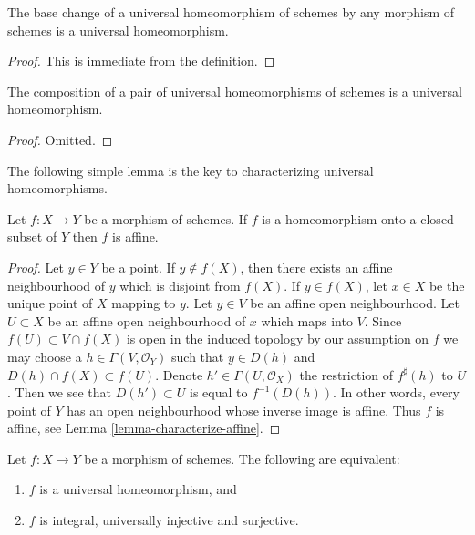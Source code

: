 \begin{lemma}
\label{lemma-base-change-universal-homeomorphism}
The base change of a universal homeomorphism of schemes
by any morphism of schemes is a universal homeomorphism.
\end{lemma}

\begin{proof}
This is immediate from the definition.
\end{proof}

\begin{lemma}
\label{lemma-composition-universal-homeomorphism}
The composition of a pair of universal homeomorphisms of
schemes is a universal homeomorphism.
\end{lemma}

\begin{proof}
Omitted.
\end{proof}

\noindent
The following simple lemma is the key to characterizing universal
homeomorphisms.

\begin{lemma}
\label{lemma-homeomorphism-affine}
Let $f : X \to Y$ be a morphism of schemes. If $f$ is a homeomorphism
onto a closed subset of $Y$ then $f$ is affine.
\end{lemma}

\begin{proof}
Let $y \in Y$ be a point. If $y \not \in f(X)$, then there exists
an affine neighbourhood of $y$ which is disjoint from $f(X)$.
If $y \in f(X)$, let $x \in X$ be the unique point of $X$ mapping to $y$.
Let $y \in V$ be an affine open neighbourhood.
Let $U \subset X$ be an affine open neighbourhood of $x$ which maps into $V$.
Since $f(U) \subset V \cap f(X)$ is open in the induced topology by our
assumption on $f$ we may choose a
$h \in \Gamma(V, \mathcal{O}_Y)$ such that $y \in D(h)$
and $D(h) \cap f(X) \subset f(U)$. Denote $h' \in \Gamma(U, \mathcal{O}_X)$
the restriction of $f^\sharp(h)$ to $U$. Then we see that
$D(h') \subset U$ is equal to $f^{-1}(D(h))$. In other words, every point
of $Y$ has an open neighbourhood whose inverse image is affine.
Thus $f$ is affine, see
Lemma \ref{lemma-characterize-affine}.
\end{proof}

\begin{lemma}
\label{lemma-universal-homeomorphism}
Let $f : X \to Y$ be a morphism of schemes. The following are
equivalent:
\begin{enumerate}
\item $f$ is a universal homeomorphism, and
\item $f$ is integral, universally injective and surjective.
\end{enumerate}
\end{lemma}

